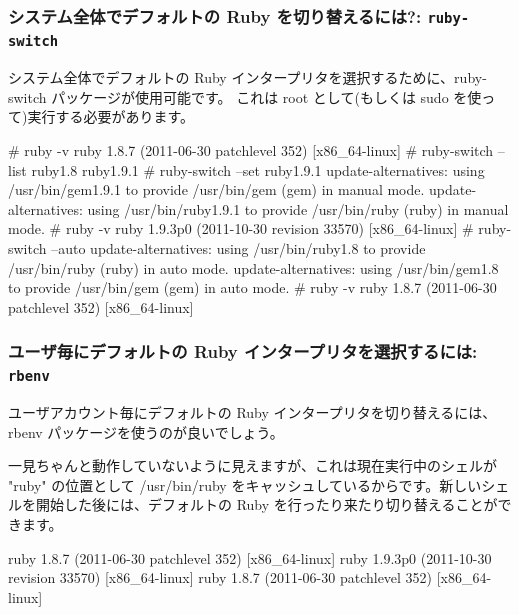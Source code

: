 \documentclass[mingoth,a4paper]{jsarticle}
\begin{document}
\subsubsection{システム全体でデフォルトの Ruby を切り替えるには?: \texttt{ruby-switch}}

システム全体でデフォルトの Ruby インタープリタを選択するために、ruby-switch パッケージが使用可能です。 これは root として(もしくは sudo を使って)実行する必要があります。
\begin{commandline}
# ruby -v
ruby 1.8.7 (2011-06-30 patchlevel 352) [x86_64-linux]
# ruby-switch --list
ruby1.8
ruby1.9.1
# ruby-switch --set ruby1.9.1
update-alternatives: using /usr/bin/gem1.9.1 to provide /usr/bin/gem (gem) in manual mode.
update-alternatives: using /usr/bin/ruby1.9.1 to provide /usr/bin/ruby (ruby) in manual mode.
# ruby -v
ruby 1.9.3p0 (2011-10-30 revision 33570) [x86_64-linux]
# ruby-switch --auto
update-alternatives: using /usr/bin/ruby1.8 to provide /usr/bin/ruby (ruby) in auto mode.
update-alternatives: using /usr/bin/gem1.8 to provide /usr/bin/gem (gem) in auto mode.
# ruby -v
ruby 1.8.7 (2011-06-30 patchlevel 352) [x86_64-linux]
\end{commandline}

\subsubsection{ユーザ毎にデフォルトの Ruby インタープリタを選択するには: \texttt{rbenv}}

ユーザアカウント毎にデフォルトの Ruby インタープリタを切り替えるには、rbenv パッケージを使うのが良いでしょう。
一見ちゃんと動作していないように見えますが、これは現在実行中のシェルが "ruby" の位置として /usr/bin/ruby をキャッシュしているからです。新しいシェルを開始した後には、デフォルトの Ruby を行ったり来たり切り替えることができます。
\begin{commandline}
ruby 1.8.7 (2011-06-30 patchlevel 352) [x86_64-linux]
ruby 1.9.3p0 (2011-10-30 revision 33570) [x86_64-linux]
ruby 1.8.7 (2011-06-30 patchlevel 352) [x86_64-linux]
\end{commandline}
\end{document}
